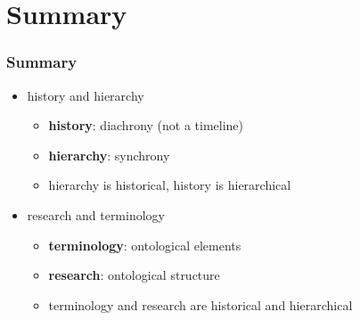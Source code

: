 \documentclass{beamer}
\begin{document}
	\section{Summary}

	\begin{frame}
		\frametitle{Summary}
		
		\begin{itemize}
			\item history and hierarchy
			\begin{itemize}
                \item \textbf{history}: diachrony (not a timeline)
                \item \textbf{hierarchy}: synchrony
                \item hierarchy is historical, history is hierarchical
            \end{itemize}
			\item research and terminology
			\begin{itemize}
                \item \textbf{terminology}: ontological elements
                \item \textbf{research}: ontological structure
                \item terminology and research are historical and hierarchical
            \end{itemize}
		\end{itemize}
	\end{frame}
\end{document}
